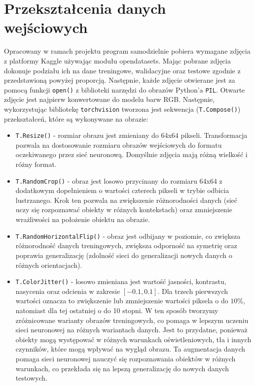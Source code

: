 \documentclass[11pt]{article}
\begin{document}
	\section{Przekształcenia danych wejściowych}
	Opracowany w ramach projektu program samodzielnie pobiera wymagane zdjęcia z platformy Kaggle używając modułu
	opendatasets. Mając pobrane zdjęcia dokonuje podziału ich na dane treningowe, walidacyjne oraz testowe zgodnie z 
	przedstawioną powyżej proporcją.
	Następnie, każde zdjęcie otwierane jest za pomocą funkcji \texttt{open()} z biblioteki narzędzi do obrazów Python'a \texttt{PIL}.
	Otwarte zdjęcie jest najpierw konwertowane do modelu barw RGB. Następnie, wykorzystując bibliotekę \texttt{torchvision}
	tworzona jest sekwencja (\texttt{T.Compose()}) przekształceń, które są wykonywane na obrazie:
	\begin{itemize}
		\item \texttt{T.Resize()} - rozmiar obrazu jest zmieniany do $64$x$64$ pikseli.
			Transformacja pozwala na dostosowanie rozmiaru obrazów wejściowych do formatu oczekiwanego
			przez sieć neuronową. Domyślnie zdjęcia mają różną wielkość i różny format.
		\item \texttt{T.RandomCrop()} - obraz jest losowo przycinany do rozmiaru 64x64 z dodatkowym dopełnieniem o wartości czterech pikseli w trybie odbicia lustrzanego.
			Krok ten pozwala na zwiększenie różnorodności danych (sieć uczy się rozpoznawać obiekty w różnych kontekstach) oraz zmniejszenie wrażliwości na położenie obiektu na obrazie.
		\item \texttt{T.RandomHorizontalFlip()} - obraz jest odbijany w poziomie, co zwiększa różnorodność danych treningowych,
			zwiększa odporność na symetrię oraz poprawia generalizację (zdolność sieci do generalizacji nowych danych o różnych orientacjach).
		\item \texttt{T.ColorJitter()} - losowo zmieniana jest wartość jasności, kontrastu, nasycenia oraz odcienia w zakresie \([-0.1, 0.1]\). Dla trzech pierwszych wartości oznacza to
			zwiększenie lub zmniejszenie wartości piksela o do $10\%$, natomiast dla tej ostatniej o do 10 stopni. W ten sposób tworzymy zróżnicowane warianty obrazów treningowych,
			co pomaga w lepszym uczeniu sieci neuronowej na różnych wariantach danych. Jest to przydatne, ponieważ obiekty mogą występować w różnych warunkach oświetleniowych,
			tła i innych czynników, które mogą wpływać na wygląd obrazu. Ta augmentacja danych pomaga sieci neuronowej nauczyć się rozpoznawania obiektów w różnych warunkach,
			co przekłada się na lepszą generalizację do nowych danych testowych.

\end{itemize}
\end{document}
